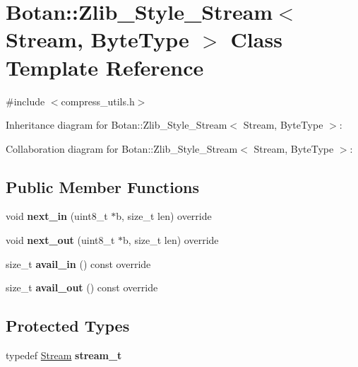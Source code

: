 \hypertarget{class_botan_1_1_zlib___style___stream}{}\section{Botan\+:\+:Zlib\+\_\+\+Style\+\_\+\+Stream$<$ Stream, Byte\+Type $>$ Class Template Reference}
\label{class_botan_1_1_zlib___style___stream}


{\ttfamily \#include $<$compress\+\_\+utils.\+h$>$}



Inheritance diagram for Botan\+:\+:Zlib\+\_\+\+Style\+\_\+\+Stream$<$ Stream, Byte\+Type $>$\+:


Collaboration diagram for Botan\+:\+:Zlib\+\_\+\+Style\+\_\+\+Stream$<$ Stream, Byte\+Type $>$\+:
\subsection*{Public Member Functions}
\begin{DoxyCompactItemize}
\item 
\mbox{\label{class_botan_1_1_zlib___style___stream_a53f9f35a4f482ffc41c7d3109b593072}} 
void {\bfseries next\+\_\+in} (uint8\+\_\+t $\ast$b, size\+\_\+t len) override
\item 
\mbox{\label{class_botan_1_1_zlib___style___stream_a3114a20ed7938aff1feb3d8395c0c244}} 
void {\bfseries next\+\_\+out} (uint8\+\_\+t $\ast$b, size\+\_\+t len) override
\item 
\mbox{\label{class_botan_1_1_zlib___style___stream_ad56742a271574f2ba44655fe4fcf5dbc}} 
size\+\_\+t {\bfseries avail\+\_\+in} () const override
\item 
\mbox{\label{class_botan_1_1_zlib___style___stream_af89a7d311aee149c1100ce3a547a8603}} 
size\+\_\+t {\bfseries avail\+\_\+out} () const override
\end{DoxyCompactItemize}
\subsection*{Protected Types}
\begin{DoxyCompactItemize}
\item 
\mbox{\label{class_botan_1_1_zlib___style___stream_a1142ec6c9323f319e79fdabef34071a4}} 
typedef \mbox{\hyperlink{struct_stream}{Stream}} {\bfseries stream\+\_\+t}
\end{DoxyCompactItemize}
